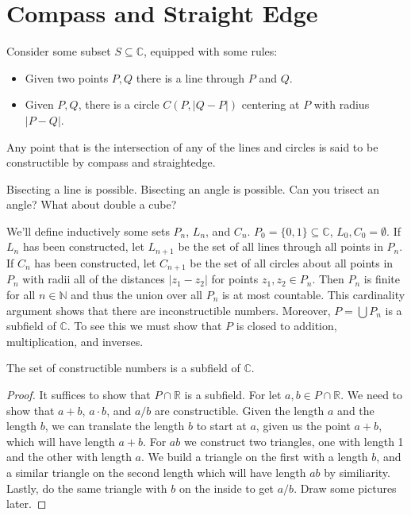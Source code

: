 \section{Compass and Straight Edge}
    Consider some subset $S\subseteq\mathbb{C}$, equipped with some rules:
    \begin{itemize}
        \item Given two points $P,Q$ there is a line through $P$ and $Q$.
        \item Given $P,Q$, there is a circle $C(P,|Q-P|)$ centering at $P$
              with radius $|P-Q|$.
    \end{itemize}
    Any point that is the intersection of any of the lines and circles is
    said to be constructible by compass and straightedge.
    \begin{example}
        Bisecting a line is possible. Bisecting an angle is possible. Can
        you trisect an angle? What about double a cube?
    \end{example}
    We'll define inductively some sets $P_{n}$, $L_{n}$, and $C_{n}$.
    $P_{0}=\{0,1\}\subseteq\mathbb{C}$, $L_{0},C_{0}=\emptyset$. If
    $L_{n}$ has been constructed, let $L_{n+1}$ be the set of all lines
    through all points in $P_{n}$. If $C_{n}$ has been constructed, let
    $C_{n+1}$ be the set of all circles about all points in $P_{n}$ with
    radii all of the distances $|z_{1}-z_{2}|$ for points
    $z_{1},z_{2}\in{P}_{n}$. Then $P_{n}$ is finite for all $n\in\mathbb{N}$
    and thus the union over all $P_{n}$ is at most countable. This
    cardinality argument shows that there are inconstructible numbers.
    Moreover, $P=\bigcup{P}_{n}$ is a subfield of $\mathbb{C}$. To see this
    we must show that $P$ is closed to addition, multiplication, and
    inverses.
    \begin{theorem}
        The set of constructible numbers is a subfield of $\mathbb{C}$.
    \end{theorem}
    \begin{proof}
        It suffices to show that $P\cap\mathbb{R}$ is a subfield. For let
        $a,b\in{P}\cap\mathbb{R}$. We need to show that $a+b$, $a\cdot{b}$,
        and $a/b$ are constructible. Given the length $a$ and the length
        $b$, we can translate the length $b$ to start at $a$, given us the
        point $a+b$, which will have length $a+b$. For $ab$ we construct
        two triangles, one with length 1 and the other with length $a$.
        We build a triangle on the first with a length $b$, and a similar
        triangle on the second length which will have length $ab$ by
        similiarity. Lastly, do the same triangle with $b$ on the inside to
        get $a/b$. Draw some pictures later.
    \end{proof}
